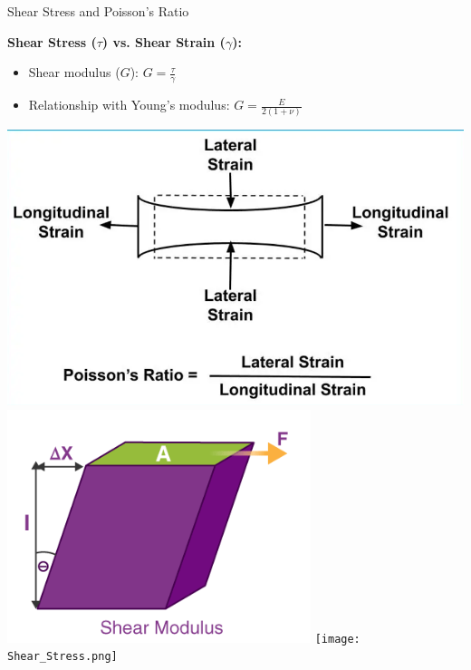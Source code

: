 \documentclass{beamer}
\begin{document}
\begin{frame}{Shear Stress and Poisson's Ratio}
\begin{minipage}[t]{0.62\textwidth}
        \textbf{Shear Stress ($\tau$) vs. Shear Strain ($\gamma$):}
        \begin{itemize}
            \item Shear modulus ($G$): $G = \frac{\tau}{\gamma}$
            \item Relationship with Young's modulus: $G = \frac{E}{2(1 + \nu)}$
        \end{itemize}
    \end{minipage}
    \hfill
    \begin{minipage}[t]{0.35\textwidth}
        \vspace{0pt}
        \includegraphics[width=\textwidth]{Ratio.png}
        \vspace{0.2cm}
        \includegraphics[width=\textwidth]{Shear_Modulous.png}
        \vspace{0.2cm}
        \texttt{[image: Shear\_Stress.png]}
    \end{minipage}
\end{frame}
\end{document}
